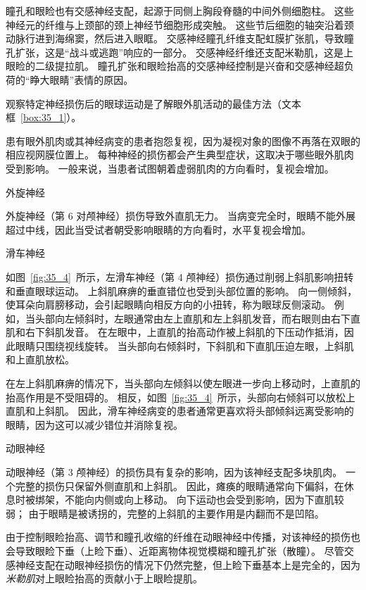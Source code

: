 瞳孔和眼睑也有交感神经支配，起源于同侧上胸段脊髓的中间外侧细胞柱。
这些神经元的纤维与上颈部的颈上神经节细胞形成突触。
这些节后细胞的轴突沿着颈动脉行进到海绵窦，然后进入眼眶。
交感神经瞳孔纤维支配虹膜扩张肌，导致瞳孔扩张，这是“战斗或逃跑”响应的一部分。
交感神经纤维还支配米勒肌，这是上眼睑的二级提拉肌。
瞳孔扩张和眼睑抬高的交感神经控制是兴奋和交感神经超负荷的“睁大眼睛”表情的原因。



观察特定神经损伤后的眼球运动是了解眼外肌活动的最佳方法（文本框~\ref{box:35_1}）。


\begin{proposition}[眼外肌肉或神经损伤] \label{box:35_1}

\quad \quad 患有眼外肌肉或其神经病变的患者抱怨复视，因为凝视对象的图像不再落在双眼的相应视网膜位置上。
每种神经的损伤都会产生典型症状，这取决于哪些眼外肌肉受到影响。
一般来说，当患者试图朝着虚弱肌肉的方向看时，复视会增加。


\quad \quad \textcolor[HTML]{00A652}{外旋神经}

\quad \quad 外旋神经（第 6 对颅神经）损伤导致外直肌无力。
当病变完全时，眼睛不能外展超过中线，因此当受试者朝受影响眼睛的方向看时，水平复视会增加。


\quad \quad \textcolor[HTML]{00A652}{滑车神经}

\quad \quad 如图~\ref{fig:35_4}~所示，左滑车神经（第 4 颅神经）损伤通过削弱上斜肌影响扭转和垂直眼球运动。
上斜肌麻痹的垂直错位也受到头部位置的影响。
向一侧倾斜，使耳朵向肩膀移动，会引起眼睛向相反方向的小扭转，称为眼球反侧滚动。
例如，当头部向左倾斜时，左眼通常由左上直肌和左上斜肌发音，而右眼则由右下直肌和右下斜肌发音。
在左眼中，上直肌的抬高动作被上斜肌的下压动作抵消，因此眼睛只围绕视线旋转。
当头部向右倾斜时，下斜肌和下直肌压迫左眼，上斜肌和上直肌放松。


\quad \quad 在左上斜肌麻痹的情况下，当头部向左倾斜以使左眼进一步向上移动时，上直肌的抬高作用是不受阻碍的。
相反，如图~\ref{fig:35_4}~所示，头部向右倾斜可以放松上直肌和上斜肌。
因此，滑车神经病变的患者通常更喜欢将头部倾斜远离受影响的眼睛，因为这可以减少错位并消除复视。


\quad \quad \textcolor[HTML]{00A652}{动眼神经}

\quad \quad 动眼神经（第 3 颅神经）的损伤具有复杂的影响，因为该神经支配多块肌肉。
一个完整的损伤只保留外侧直肌和上斜肌。
因此，瘫痪的眼睛通常向下偏斜，在休息时被绑架，不能向内侧或向上移动。
向下运动也会受到影响，因为下直肌较弱；
由于眼睛是被诱拐的，完整的上斜肌的主要作用是内翻而不是凹陷。


\quad \quad 由于控制眼睑抬高、调节和瞳孔收缩的纤维在动眼神经中传播，对该神经的损伤也会导致眼睑下垂（上睑下垂）、近距离物体视觉模糊和瞳孔扩张（散瞳）。
尽管交感神经支配在动眼神经损伤的情况下仍然完整，但上睑下垂基本上是完全的，因为\textit{米勒肌}对上眼睑抬高的贡献小于上眼睑提肌。



\end{proposition}
